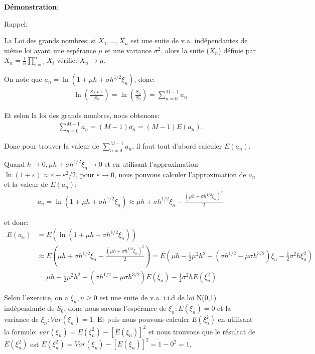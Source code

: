 \documentclass[a4paper,10pt]{report}
\begin{document}
\noindent \textbf{Démonstration}:
\par \noindent Rappel: 
\par \noindent La Loi des grands nombres: si $X_{1}, \dots, X_{n}$ est une suite de v.a. indépendantes de même loi ayant une espérance $\mu$ et une variance $\sigma^{2}$, alors la suite ($\overline{X_{n}}$) définie par $\overline{X_{n}} = \frac{1}{n} \prod_{i=1}^{n}X_{i}$ vérifie: $\overline{X_{n}} \rightarrow \mu$.
\par \noindent On note que $a_{n} = \ln (1 + \mu h + \sigma h^{1/2} \xi_{n})$, donc:
\begin{align*}
	\ln (\frac{S(t)}{S_{0}}) = \ln (\frac{S_{n}}{S_{0}}) = \sum_{n=0}^{M-1} a_{n}
\end{align*}
\par \noindent Et selon la loi des grands nombres, nous obtenons:
\begin{align*} 
\sum_{n=0}^{M-1} a_{n} = (M-1) \overline{a_{n}} = (M-1) E(a_{n}).
\end{align*} 
\par \noindent Donc pour trouver la valeur de $\sum_{n=0}^{M-1} a_{n}$, il faut tout d'abord calculer $E(a_{n})$.
\par \noindent Quand $h \rightarrow 0, \mu h + \sigma h^{1/2} \xi_{n} \rightarrow 0$ et en utilisant l'approximation $\ln (1 + \varepsilon) \approx \varepsilon - \varepsilon^{2} / 2$, pour $\varepsilon \rightarrow 0$, nous pouvons calculer l'approximation de $a_{n}$ et la valeur de $E(a_{n})$:
\begin{align*}
	a_{n} = \ln (1 + \mu h + \sigma h^{1/2} \xi_{n}) \approx \mu h +\sigma h^{1/2} \xi_{n} - \frac{(\mu h + \sigma h^{1/2} \xi_{n})^{2}}{2}
\end{align*}
\par \noindent et donc:
\begin{align*}
E(a_{n}) &= E(\ln (1 + \mu h + \sigma h^{1/2} \xi_{n})) \\
&\approx E(\mu h +\sigma h^{1/2} \xi_{n} - \frac{(\mu h + \sigma h^{1/2} \xi_{n})^{2}}{2}) = E(\mu h -\frac{1}{2} \mu^{2} h^{2} + (\sigma h^{1/2} - \mu \sigma h^{3/2}) \xi_{n} -\frac{1}{2} \sigma^{2} h \xi_{n}^{2})\\
&= \mu h -\frac{1}{2} \mu^{2} h^{2} + (\sigma h^{1/2} - \mu \sigma h^{3/2}) E(\xi_{n}) -\frac{1}{2} \sigma^{2} h E(\xi_{n}^{2})
\end{align*}
\par \noindent Selon l'exercice, on a $\xi_{n}, n \geq 0$ est une suite de v.a. i.i.d de loi N(0,1) indépendante de $S_{0}$, donc nous savons l'espérance de $\xi_{n}: E(\xi_{n}) = 0$ et la variance de $\xi_{n}: Var(\xi_{n}) = 1$.  Et puis nous pouvons calculer $E(\xi_{n}^{2})$ en utilisant la formule: $var(\xi_{n}) = E(\xi_{n}^{2}) - [E(\xi_{n})]^{2}$ et nous trouvons que le résultat de $E(\xi_{n}^{2})$ est $E(\xi_{n}^{2}) = Var(\xi_{n}) - [E(\xi_{n})]^{2} = 1 - 0^{2} = 1$.
\end{document}
